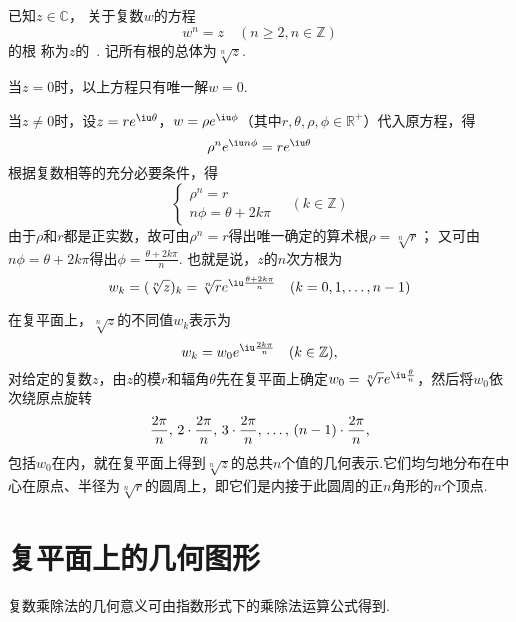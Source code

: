 \begin{definition}%
已知\(z\in\mathbb{C}\)，
关于复数\(w\)的方程\begin{equation*}
	w^n = z \quad (n \geq 2, n \in \mathbb{Z})
\end{equation*}的根
称为\(z\)的~.
记所有根的总体为\(\sqrt[n]{z}\).

当\(z=0\)时，以上方程只有唯一解\(w = 0\).

当\(z \neq 0\)时，设\(z=re^{\iu \theta}\)，\(w=\rho e^{\iu \phi}\)（其中\(r,\theta,\rho,\phi\in\mathbb{R}^+\)）代入原方程，得\begin{equation*}
\rho^n e^{\iu n \phi} = r e^{\iu \theta}
\end{equation*}根据复数相等的充分必要条件，得\begin{equation*}
\left\{ \begin{array}{l}
\rho^n = r \\
n\phi = \theta + 2k\pi
\end{array} \right. \quad (k \in \mathbb{Z})
\end{equation*}由于\(\rho\)和\(r\)都是正实数，故可由\(\rho^n=r\)得出唯一确定的算术根\(\rho=\sqrt[n]{r}\)；
又可由\(n\phi=\theta+2k\pi\)得出\(\phi=\frac{\theta+2k\pi}{n}\).
也就是说，\(z\)的\(n\)次方根为\begin{equation*}
w_k = (\sqrt[n]{z})_k = \sqrt[n]{r} e^{\iu \frac{\theta + 2k\pi}{n}} \quad (k=0,1,\dotsc,n-1)
\end{equation*}
\end{definition}

在复平面上，\(\sqrt[n]{z}\)的不同值\(w_k\)表示为\begin{equation*}
w_k = w_0 e^{\iu \frac{2k\pi}{n}} \quad (k \in \mathbb{Z}),
\end{equation*}对给定的复数\(z\)，由\(z\)的模\(r\)和辐角\(\theta\)先在复平面上确定\(w_0 = \sqrt[n]{r} e^{\iu \frac{\theta}{n}}\)，然后将\(w_0\)依次绕原点旋转\begin{equation*}
\def\f{\frac{2\pi}{n}}
\f,\,2\cdot\f,\,3\cdot\f,\,\dots,\,(n-1)\cdot\f,
\end{equation*}包括\(w_0\)在内，就在复平面上得到\(\sqrt[n]{z}\)的总共\(n\)个值的几何表示.它们均匀地分布在中心在原点、半径为\(\sqrt[n]{r}\)的圆周上，即它们是内接于此圆周的正\(n\)角形的\(n\)个顶点.

\section{复平面上的几何图形}
复数乘除法的几何意义可由指数形式下的乘除法运算公式得到.

